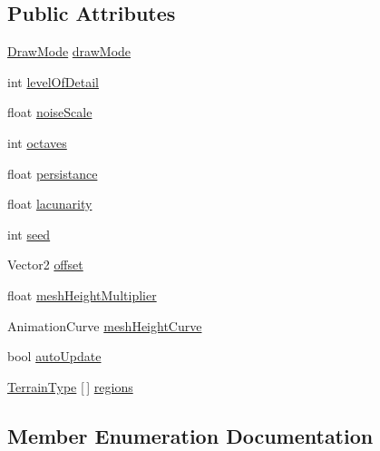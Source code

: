 \subsection*{Public Attributes}
\begin{DoxyCompactItemize}
\item 
\mbox{\hyperlink{class_map_generator_ad11b508087506616937d0dac5576c2ab}{Draw\+Mode}} \mbox{\hyperlink{class_map_generator_ab7abc6f55e460a0778c8f9fb0922c0b2}{draw\+Mode}}
\item 
int \mbox{\hyperlink{class_map_generator_a36dc6ed804922345576a48c92ca2a7c5}{level\+Of\+Detail}}
\item 
float \mbox{\hyperlink{class_map_generator_a240eb7cb057720f6b650ba7f89f73857}{noise\+Scale}}
\item 
int \mbox{\hyperlink{class_map_generator_a89c8da977598552d30b0110669b09960}{octaves}}
\item 
float \mbox{\hyperlink{class_map_generator_afc59b0a77b7165a6654e08d0e8580e60}{persistance}}
\item 
float \mbox{\hyperlink{class_map_generator_ada5f0345bb8a65536c3aa911f63565af}{lacunarity}}
\item 
int \mbox{\hyperlink{class_map_generator_a7ad3b7337f5252b30d873f0d76a06fcb}{seed}}
\item 
Vector2 \mbox{\hyperlink{class_map_generator_a785c0d701c764003f0c7dfdd3be5077c}{offset}}
\item 
float \mbox{\hyperlink{class_map_generator_ad0ea5ea76e455736a4b831774fca1029}{mesh\+Height\+Multiplier}}
\item 
Animation\+Curve \mbox{\hyperlink{class_map_generator_a814ef92c835bac7d01e4c839bd4580ab}{mesh\+Height\+Curve}}
\item 
bool \mbox{\hyperlink{class_map_generator_af0843909ea371f9eee073691750482c3}{auto\+Update}}
\item 
\mbox{\hyperlink{struct_terrain_type}{Terrain\+Type}} \mbox{[}$\,$\mbox{]} \mbox{\hyperlink{class_map_generator_adaca0c66c3812a547927a6fcdd353dc7}{regions}}
\end{DoxyCompactItemize}


\subsection{Member Enumeration Documentation}
\mbox{\label{class_map_generator_ad11b508087506616937d0dac5576c2ab}} 
